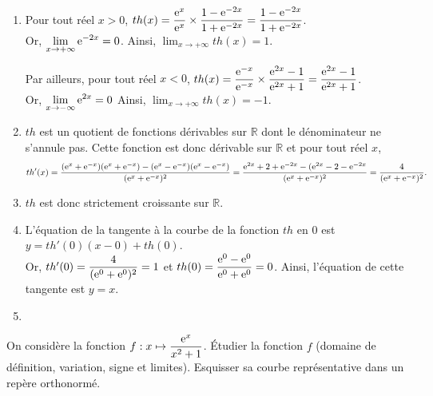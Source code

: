 \documentclass[11pt,fleqn, openany]{book} %
\begin{document}
\begin{solution}\hspace{0pt}
\begin{enumerate}
\item Pour tout réel $x>0$,  $th(x)=\dfrac{\mathrm{e}^x}{\mathrm{e}^x} \times \dfrac{1-\mathrm{e}^{-2x}}{1+\mathrm{e}^{-2x}} = \dfrac{1-\mathrm{e}^{-2x}}{1+\mathrm{e}^{-2x}}$.\\ Or, $\displaystyle\lim_{x\to+\infty}\mathrm{e}^{-2x}=0$. Ainsi, $\displaystyle\lim_{x \to +\infty}th(x)=1$.

Par ailleurs, pour tout réel $x<0$, $th(x)=\dfrac{\mathrm{e}^{-x}}{\mathrm{e}^{-x}} \times \dfrac{\mathrm{e}^{2x}-1}{\mathrm{e}^{2x}+1} = \dfrac{\mathrm{e}^{2x}-1}{\mathrm{e}^{2x}+1} $. \\Or, $\displaystyle\lim_{x\to -\infty}\mathrm{e}^{2x}=0$ Ainsi, $\displaystyle\lim_{x\to+\infty}th(x)=-1$.

\item $th$ est un quotient de fonctions dérivables sur $\mathbb{R}$ dont le dénominateur ne s'annule pas. Cette fonction est donc dérivable sur $\mathbb{R}$ et pour tout réel $x$,
\[th'(x)=\dfrac{(\mathrm{e}^x+\mathrm{e}^{-x})(\mathrm{e}^x+\mathrm{e}^{-x})-(\mathrm{e}^x-\mathrm{e}^{-x})(\mathrm{e}^x-\mathrm{e}^{-x})}{(\mathrm{e}^x+\mathrm{e}^{-x})^2}=\dfrac{\mathrm{e}^{2x}+2+\mathrm{e}^{-2x}-(\mathrm{e}^{2x}-2-\mathrm{e}^{-2x}}{(\mathrm{e}^x+\mathrm{e}^{-x})^2}=\dfrac{4}{(\mathrm{e}^x+\mathrm{e}^{-x})^2}.\]
\item $th$ est donc strictement croissante sur $\mathbb{R}$.
\item L'équation de la tangente à la courbe de la fonction $th$ en 0 est $y=th'(0)(x-0)+th(0)$.\\ Or, $th'(0)=\dfrac{4}{(\mathrm{e}^0+\mathrm{e}^0)^2}=1$ et $th(0)=\dfrac{\mathrm{e}^0-\mathrm{e}^0}{\mathrm{e}^0+\mathrm{e}^0}=0$. Ainsi, l'équation de cette tangente est $y=x$.
\item \begin{center}
\end{center}
\end{enumerate}

\end{solution}




\begin{exercise}
On considère la fonction $f:x\mapsto \dfrac{\mathrm{e}^x}{x^2+1}$. Étudier la fonction $f$ (domaine de définition, variation, signe et limites). Esquisser sa courbe représentative dans un repère orthonormé.\end{exercise}
\end{document}
